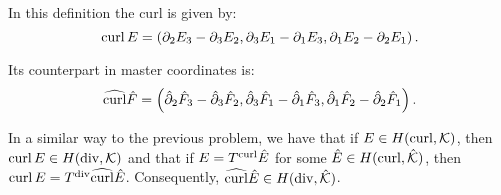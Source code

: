 \noindent In this definition the curl is given by:
%
\begin{equation}
    \operatorname{curl} E=\left(\partial_2 E_3-\partial_3 E_2,\partial_3 E_1-\partial_1 E_3,\partial_1 E_2-\partial_2 E_1\right).
\end{equation}

\noindent Its counterpart in master coordinates is:
%
\begin{equation}
    \widehat{\operatorname{curl}} \hat{F}=\left(\hat{\partial}_2 \hat{F}_3-\hat{\partial}_3 \hat{F}_2,\hat{\partial}_3 \hat{F}_1-\hat{\partial}_1 \hat{F}_3,\hat{\partial}_1 \hat{F}_2-\hat{\partial}_2 \hat{F}_1\right).
\end{equation}

In a similar way to the previous problem, we have that if $E\in H(\operatorname{curl},\mathcal{K})$, then $\operatorname{curl} E\in H(\operatorname{div},\mathcal{K})$ and that if $E=T^{\operatorname{curl}}\hat{E}$ for some $\hat{E}\in H(\operatorname{curl},\hat{\mathcal{K}})$, then $\operatorname{curl} E=T^{\operatorname{div}}\widehat{\operatorname{curl}}\hat{E}$. Consequently, $\widehat{\operatorname{curl}}\hat{E}\in H(\operatorname{div},\hat{\mathcal{K}})$.

